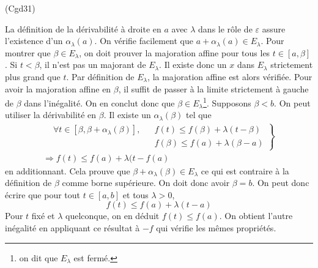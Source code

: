 \begin{tiny}(Cgd31)\end{tiny} La définition de la dérivabilité à droite en $a$ avec $\lambda$ dans le rôle de $\varepsilon$ assure l'existence d'un $\alpha_\lambda(a)$. On vérifie facilement que $a+\alpha_\lambda(a)\in E_\lambda$.\newline
Pour montrer que $\beta\in E_\lambda$, on doit prouver la majoration affine pour tous les $t\in [a,\beta]$.\newline
Si $t<\beta$, il n'est pas un majorant de $E_\lambda$. Il existe donc un $x$ dans $E_\lambda$ strictement plus grand que $t$. Par définition de $E_\lambda$, la majoration affine est alors vérifiée. 
Pour avoir la majoration affine en $\beta$, il suffit de passer à la limite strictement à gauche de $\beta$ dans l'inégalité. On en conclut donc que $\beta\in E_\lambda$\footnote{on dit que $E_\lambda$ est fermé.}.\newline
Supposons $\beta <b$. On peut utiliser la dérivabilité en $\beta$. Il existe un $\alpha_\lambda(\beta)$ tel que
\begin{multline*}
\left. 
\begin{aligned}
 &\forall t\in[\beta,\beta + \alpha_\lambda(\beta)],& & f(t)\leq f(\beta) + \lambda(t-\beta)\\
 & & & f(\beta)\leq f(a) + \lambda(\beta -a)
\end{aligned}
\right\rbrace \\
\Rightarrow
f(t)\leq f(a)+\lambda(t-f(a)
\end{multline*}
 en additionnant. Cela prouve que $\beta + \alpha_\lambda(\beta)\in E_\lambda$ ce qui est contraire à la définition de $\beta$ comme borne supérieure. On doit donc avoir $\beta=b$.\newline
On peut donc écrire que pour tout $t\in[a,b]$ et tous $\lambda >0$,
\begin{displaymath}
 f(t)\leq f(a) + \lambda(t-a)
\end{displaymath}
Pour $t$ fixé et $\lambda$ quelconque, on en déduit $f(t)\leq f(a)$. On obtient l'autre inégalité en appliquant ce résultat à $-f$ qui vérifie les mêmes propriétés.